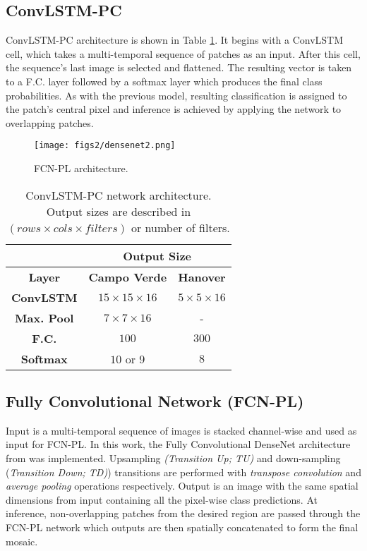 \subsection{ConvLSTM-PC}

ConvLSTM-PC architecture is shown in Table \ref{table:convlstm}. It begins with a ConvLSTM cell, which takes a multi-temporal sequence of patches as an input. After this cell, the sequence's last image is selected and flattened. The resulting vector is taken to a F.C. layer followed by a softmax layer which produces the final class probabilities. As with the previous model, resulting classification is assigned to the patch's central pixel and inference is achieved by applying the network to overlapping patches. \vspace{0.5cm}

\begin{figure*}[t!]
\centering
\texttt{[image: figs2/densenet2.png]}
\caption{FCN-PL architecture. }
\label{fig:class_distr}
\end{figure*}
\begin{table}[h!]
\centering
\caption{ConvLSTM-PC network architecture. Output sizes are described in $(rows\times cols\times filters)$ or number of filters.}
\label{table:convlstm}
\begin{tabular}{|c|c|c|}
\hline
\multicolumn{1}{|l|}{} & \multicolumn{2}{c|}{\textbf{Output Size}}     \\ \hline
\textbf{Layer}         & \textbf{Campo Verde}   & \textbf{Hanover}     \\ \hline
\textbf{ConvLSTM}      & $15\times 15\times 16$ & $5\times 5\times 16$ \\ \hline
\textbf{Max. Pool}     & $7\times 7\times 16$   & -                    \\ \hline
\textbf{F.C.}          & $100$                  & $300$                \\ \hline
\textbf{Softmax}       & $10$ or $9$              & $8$                  \\ \hline
\end{tabular}
\end{table}



\subsection{Fully Convolutional Network (FCN-PL)}
Input is a multi-temporal sequence of images is stacked channel-wise and used as input for FCN-PL. In this work, the Fully Convolutional DenseNet architecture from \cite{jegou2017one} was implemented. Upsampling \textit{(Transition Up; TU)} and down-sampling (\textit{Transition Down; TD)}) transitions are performed with \textit{transpose convolution} and \textit{average pooling} operations respectively. Output is an image with the same spatial dimensions from input containing all the pixel-wise class predictions. At inference, non-overlapping patches from the desired region are passed through the FCN-PL network which outputs are then spatially concatenated to form the final mosaic.
 
